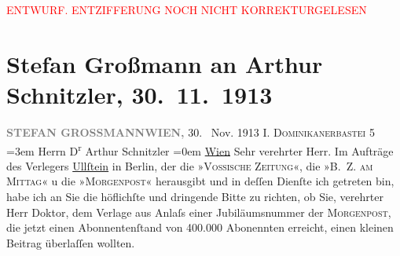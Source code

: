 
\begin{center}
            \textcolor{red}{ENTWURF. ENTZIFFERUNG NOCH NICHT KORREKTURGELESEN}
                      \end{center}
            
               \section[Stefan Großmann an Arthur Schnitzler, 30. 11. 1913]{ Stefan Großmann an Arthur Schnitzler, 30. 11. 1913}\nopagebreak{}\rehead{ }\begin{ledgroupsized}[t]{13cm}\normalsize\beginnumbering{} \toendnotes[C]{\smallbreak\pagebreak[2]} 
\pstart
           \noindent{}{\pb}\textcolor{gray}{\textbf{STEFAN GROSSMANN}}\hfill \textcolor{gray}{\textbf{WIEN,}}{ }30.  Nov. 1913\pend
           \pstart
           \raggedleft{}I. \textsc{Dominikanerbastei}
                            5\pend
           \leftskip=3em{}\pstart
           \noindent{}Herrn D\textsuperscript{r} Arthur Schnitzler\pend
           \leftskip=0em{}\pstart
           \noindent{}\raggedleft{}\uline{Wien}\pend
           \pstart{}Sehr verehrter Herr.\pend\pstart
           Im Aufträge des Verlegers \uline{Ullſtein} in Berlin, der die »\textsc{Vossische Zeitung}«, die »\textsc{B. Z. am Mittag}« u die »\textsc{Morgenpost}« herausgibt und in deſſen Dienſte ich getreten bin, habe ich an Sie die
                    höflichſte und dringende Bitte zu richten, ob Sie, verehrter Herr Doktor, dem
                    Verlage aus Anlaſs einer Jubiläumsnummer der \textsc{Morgenpost}, die jetzt einen Abonnentenſtand von 400.000 Abonennten erreicht, einen
                    kleinen Beitrag überlaſſen wollten.\pend

\end{ledgroupsized}
